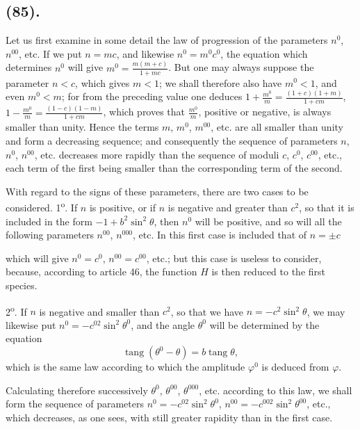 \documentclass{article}
\begin{document}
\subsection*{(85).}

Let us first examine in some detail the law of progression of the parameters $n^{0}$, $n^{00}$, etc. If we put $n=mc$, and likewise $n^{0}=m^{0}c^{0}$, the equation which determines $n^{0}$ will give $m^{0}=\frac{m(m+c)}{1+mc}$. But one may always suppose the parameter $n<c$, which gives $m<1$; we shall therefore also have $m^{0}<1$, and even $m^{0}<m$; for from the preceding value one deduces $1+\frac{m^{0}}{m}=\frac{(1+c)(1+m)}{1+cm}$, $1-\frac{m^{0}}{m}=\frac{(1-c)(1-m)}{1+cm}$, which proves that $\frac{m^{0}}{m}$, positive or negative, is always smaller than unity. Hence the terms $m$, $m^{0}$, $m^{00}$, etc. are all smaller than unity and form a decreasing sequence; and consequently the sequence of parameters $n$, $n^{0}$, $n^{00}$, etc. decreases more rapidly than the sequence of moduli $c$, $c^{0}$, $c^{00}$, etc., each term of the first being smaller than the corresponding term of the second.

With regard to the signs of these parameters, there are two cases to be considered. 1\textsuperscript{o}. If $n$ is positive, or if $n$ is negative and greater than $c^{2}$, so that it is included in the form $-1+b^{2}\sin^{2}\theta$, then $n^{0}$ will be positive, and so will all the following parameters $n^{00}$, $n^{000}$, etc. In this first case is included that of $n=\pm c$

which will give $n^{0}=c^{0}$, $n^{00}=c^{00}$, etc.; but this case is useless to consider, because, according to article 46, the function $H$ is then reduced to the first species.

2\textsuperscript{o}. If $n$ is negative and smaller than $c^{2}$, so that we have $n=-c^{2}\sin^{2}\theta$, we may likewise put $n^{0}=-c^{02}\sin^{2}\theta^{0}$, and the angle $\theta^{0}$ will be determined by the equation
\[ \operatorname{tang}(\theta^{0}-\theta)=b\operatorname{tang}\theta, \]
which is the same law according to which the amplitude $\varphi^{0}$ is deduced from $\varphi$.

Calculating therefore successively $\theta^{0}$, $\theta^{00}$, $\theta^{000}$, etc. according to this law, we shall form the sequence of parameters $n^{0}=-c^{02}\sin^{2}\theta^{0}$, $n^{00}=-c^{002}\sin^{2}\theta^{00}$, etc., which decreases, as one sees, with still greater rapidity than in the first case.
\end{document}
